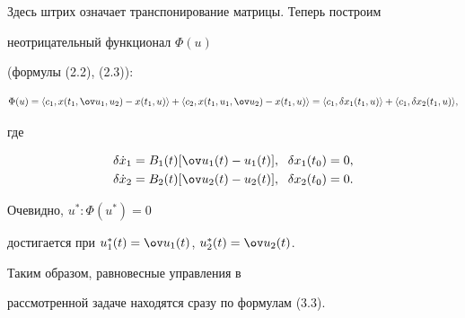 \begin{exam}
\begin{equation}
\end{equation}


Здесь штрих означает транспонирование матрицы. Теперь построим 


неотрицательный функционал $\Phi(u)$


(формулы (2.2), (2.3)):


$$


\Phi(u)=\langle c_1,x(t_1,\ov u_1,u_2)-x(t_1,u)\rangle+


\langle c_2,x(t_1,u_1,\ov u_2)-x(t_1,u)\rangle= 


\langle c_1,\delta x_1(t_1,u)\rangle+\langle c_1,\delta x_2(t_1,u)\rangle,


$$


где


\begin{gather*}


\delta \Dot x_1=B_1(t)[\ov u_1(t)-u_1(t)],\ \; \delta x_1(t_0)=0, \\


%


\delta \dot x_2=B_2(t)[\ov u_2(t)-u_2(t)],\ \; \delta x_2(t_0)=0.


\end{gather*}


Очевидно, $u^{\ast}: \Phi(u^{\ast})=0$


достигается при $u_1^{\ast}(t)=\ov u_1(t)$, $u_2^{\ast}(t)=\ov u_2(t)$.


Таким образом, равновесные управления в 


рассмотренной задаче находятся сразу по формулам (3.3).


\end{exam}





